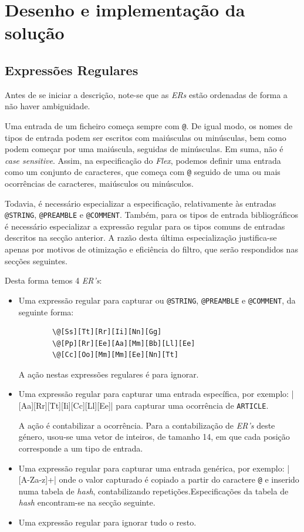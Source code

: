 \section{Desenho e implementação da solução}
\label{sec:des:a}

\subsection{Expressões Regulares}
Antes de se iniciar a descrição, note-se que as \emph{ERs} estão ordenadas de
forma a não haver ambiguidade.


Uma entrada de um ficheiro  começa sempre com \texttt{@}. De
igual modo, os nomes de tipos de entrada podem ser escritos com maiúsculas ou
minúsculas, bem como podem começar por uma maiúscula, seguidas de minúsculas. Em
suma, não é \emph{case sensitive}. Assim, na especificação do \emph{Flex},
podemos definir uma entrada como um conjunto de caracteres, que começa com
\texttt{@} seguido de uma ou mais ocorrências de caracteres, maiúsculos ou
minúsculos.

Todavia, é necessário especializar a especificação, relativamente às entradas
\texttt{@STRING}, \texttt{@PREAMBLE} e \texttt{@COMMENT}. Também, para os tipos
de entrada bibliográficos é necessário especializar a expressão regular para os
tipos comuns de entradas descritos na secção anterior. A razão desta última
especialização justifica-se apenas por motivos de otimização e eficiência do
filtro, que serão respondidos nas secções seguintes. 

Desta forma temos 4 \emph{ER's}:

\begin{itemize}
	\item Uma expressão regular para capturar ou \texttt{@STRING},
		\texttt{@PREAMBLE} e \texttt{@COMMENT}, da seguinte forma:
\begin{verbatim}
		\@[Ss][Tt][Rr][Ii][Nn][Gg]
		\@[Pp][Rr][Ee][Aa][Mm][Bb][Ll][Ee]
		\@[Cc][Oo][Mm][Mm][Ee][Nn][Tt]
\end{verbatim}

A ação nestas expressões regulares é para ignorar.


	\item Uma expressão regular para capturar uma entrada específica, por exemplo:
		|\@[Aa][Rr][Tt][Ii][Cc][Ll][Ee]| para capturar uma ocorrência de
		\texttt{ARTICLE}.

		A ação é contabilizar a ocorrência. Para a contabilização de \emph{ER's}
		deste género, usou-se uma vetor de inteiros, de tamanho 14, em que cada
		posição corresponde a um tipo de entrada.
\newpage

	\item Uma expressão regular para capturar uma entrada genérica, por exemplo:
		|\@[A-Za-z]+| onde o valor capturado é copiado a partir do
		caractere \texttt{@} e inserido numa tabela de
		\emph{hash}, contabilizando repetições.Especificações da tabela de
			\emph{hash} encontram-se na secção seguinte.
	\item Uma expressão regular para ignorar tudo o resto.

\end{itemize}


